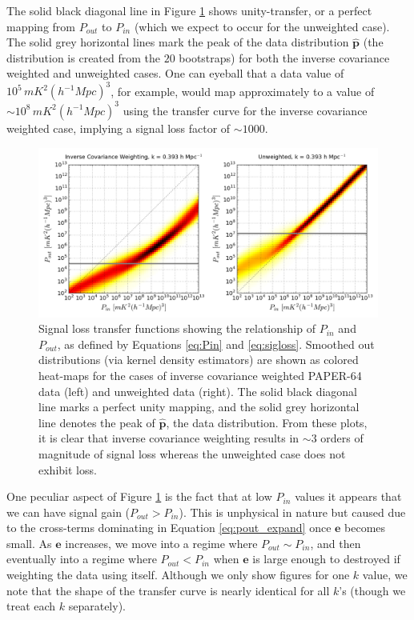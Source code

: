 \documentclass[preprint2,numberedappendix,tighten]{aastex6}  %
\begin{document}
The solid black diagonal line in Figure \ref{fig:sigloss_transfercurve} shows unity-transfer, or a perfect mapping from $P_{out}$ to $P_{in}$ (which we expect to occur for the unweighted case). The solid grey horizontal lines mark the peak of the data distribution $\hat{\textbf{p}}$ (the distribution is created from the $20$ bootstraps) for both the inverse covariance weighted and unweighted cases. One can eyeball that a data value of $10^{5} \, mK^{2} (h^{-1} Mpc)^{3}$, for example, would map approximately to a value of $\sim10^{8} \, mK^{2} (h^{-1} Mpc)^{3}$ using the transfer curve for the inverse covariance weighted case, implying a signal loss factor of $\sim1000$. 

\begin{figure}
	\centering
	\includegraphics[width=1\textwidth]{plots/sigloss_transfercurve.png}
	\caption{Signal loss transfer functions showing the relationship of $P_{in}$ and $P_{out}$, as defined by Equations \ref{eq:Pin} and \ref{eq:sigloss}. Smoothed out distributions (via kernel density estimators) are shown as colored heat-maps for the cases of inverse covariance weighted PAPER-64 data (left) and unweighted data (right). The solid black diagonal line marks a perfect unity mapping, and the solid grey horizontal line denotes the peak of $\hat{\textbf{p}}$, the data distribution. From these plots, it is clear that inverse covariance weighting results in $\sim3$ orders of magnitude of signal loss whereas the unweighted case does not exhibit loss.}
	\label{fig:sigloss_transfercurve}
\end{figure}

One peculiar aspect of Figure \ref{fig:sigloss_transfercurve} is the fact that at low $P_{in}$ values it appears that we can have signal gain ($P_{out} > P_{in}$). This is unphysical in nature but caused due to the cross-terms dominating in Equation \ref{eq:pout_expand} once $\textbf{e}$ becomes small. As $\textbf{e}$ increases, we move into a regime where $P_{out} \sim P_{in}$, and then eventually into a regime where $P_{out} < P_{in}$ when $\textbf{e}$ is large enough to destroyed if weighting the data using itself. Although we only show figures for one $k$ value, we note that the shape of the transfer curve is nearly identical for all $k$'s (though we treat each $k$ separately).
\end{document}
